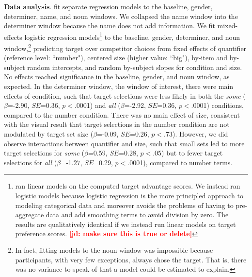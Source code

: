 \documentclass[10pt,letterpaper]{article}
\newcommand{\jd}[1]{\textcolor{Red}{\textbf{[jd: #1]}}}
\begin{document}
\textbf{Data analysis}.  fit separate regression models to the baseline, gender, determiner, name, and noun windows. We collapsed the name window into the determiner window because the name does not add information. We fit mixed-effects logistic regression models\footnote{ ran linear models on the computed target advantage scores. We instead ran logistic models because logistic regression is the more principled approach to modeling categorical data and moreover avoids the problems of having to pre-aggregate data and add smoothing terms to avoid division by zero. The results are qualitatively identical if we instead run linear models on target preference scores. \jd{make sure this is true or delete}} to the baseline, gender, determiner, and noun window,\footnote{In fact, fitting models to the noun window was impossible because participants, with very few exceptions, always chose the target. That is, there was no variance to speak of that a model could be estimated to explain.} predicting target over competitor choices from fixed effects of quantifier (reference level: ``number"), centered size (higher value: ``big"), by-item and by-subject random intercepts, and random by-subject slopes for condition and size. No effects reached significance in the baseline, gender, and noun window, as expected. In the determiner window, the window of interest, there were main effects of condition, such that target selections were less likely in both the \emph{some} ($\beta$=-2.90, $SE$=0.36, $p<$.0001) and \emph{all} ($\beta$=-2.92, $SE$=0.36, $p<$.0001) conditions, compared to the number condition. There was no main effect of size, consistent with the visual result that target selections in the number condition are not modulated by  target set size ($\beta$=-0.09, $SE$=0.26, $p<$.73). However, we did observe interactions between quantifier and size, such that small sets led to more target selections for \emph{some} ($\beta$=0.59, $SE$=0.28, $p<$.05) but to fewer target selections for \emph{all} ($\beta$=-1.27, $SE$=0.29, $p<$.0001), compared to number terms. 

\end{document}
